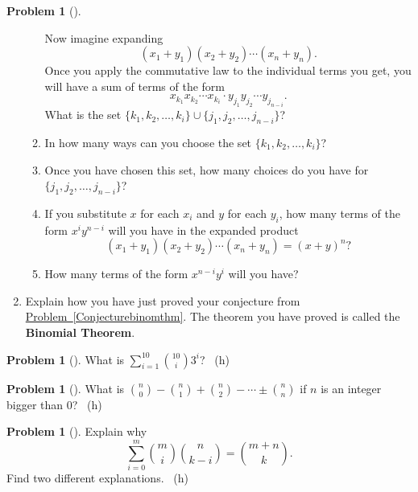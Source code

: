 \documentclass[10pt,]{book}
\newcommand{\terminology}[1]{\textbf{#1}}
\theoremstyle{plain}
\theoremstyle{definition}
\newtheorem{activity}[project]{Problem}
\theoremstyle{definition}
\numberwithin{equation}{chapter}
\begin{document}
\begin{activity}[]
\begin{enumerate}[font=\bfseries,label=(\alph*),ref=\alph*]
\begin{enumerate}[font=\bfseries,label=(\roman*),ref=\theenumi.\roman*]
Now imagine expanding%
\begin{equation*}
(x_1+y_1)(x_2+y_2)\cdots (x_n+y_n).
\end{equation*}
Once you apply the commutative law to the individual terms you get, you will have a sum of terms of the form%
\begin{equation*}
x_{k_1}x_{k_2}\cdots x_{k_i}\cdot y_{j_1}y_{j_2}\cdots
y_{j_{n-i}}.
\end{equation*}
What is the set \(\{k_1,k_2,\ldots, k_i\}\cup \{j_1,j_2,\ldots, j_{n-i}\}\)?%
\item\label{task-70} \marginsymbol[-2.5em]{} \hypertarget{p-338}{}%
In how many ways can you choose the set \(\{k_1,k_2,\ldots, k_i\}\)?%
\item\label{task-71} \marginsymbol[-2.5em]{} \hypertarget{p-340}{}%
Once you have chosen this set, how many choices do you have for \(\{j_1,j_2,\ldots, j_{n-i}\}\)?%
\item\label{task-72} \marginsymbol[-2.5em]{} \hypertarget{p-342}{}%
If you substitute \(x\) for each \(x_i\) and \(y\) for each \(y_i\), how many terms of the form \(x^iy^{n-i}\) will you have in the expanded product%
\begin{equation*}
(x_1+y_1)(x_2+y_2)\cdots (x_n+y_n)=(x+y)^n?
\end{equation*}
%
\item\label{task-73} \marginsymbol[-2.5em]{} \hypertarget{p-344}{}%
How many terms of the form \(x^{n-i}y^i\) will you have?%
\end{enumerate}
\item\label{bin-thm-concl} \marginsymbol[-2.5em]{} \hypertarget{p-346}{}%
Explain how you have just proved your conjecture from \hyperref[Conjecturebinomthm]{Problem~\ref{Conjecturebinomthm}}.  The theorem you have proved is called the \terminology{Binomial Theorem}.%
\end{enumerate}
\end{activity}
\begin{activity}[]\marginsymbol[-1em]{} \label{activity-55}
\hypertarget{p-348}{}%
What is \(\sum_{i=1}^{10} \binom{10}{i}3^i\)?%
~{\tiny (h)}\end{activity}
\begin{activity}[]\marginsymbol[-1em]{} \label{activity-56}
\hypertarget{p-351}{}%
What is \(\binom{n}{0}-\binom{n}{1}+\binom{n}{2}-\cdots \pm
\binom{n}{n}\) if \(n\) is an integer bigger than 0?%
~{\tiny (h)}\end{activity}
\begin{activity}[]\marginsymbol[-1em]{} \label{activity-57}
\hypertarget{p-354}{}%
Explain why%
\begin{equation*}
\sum_{i=0}^m\binom{m}{i}\binom{n}{k-i} = \binom{m+n}{k}.
\end{equation*}
Find two different explanations.%
~{\tiny (h)}\end{activity}
\end{document}
